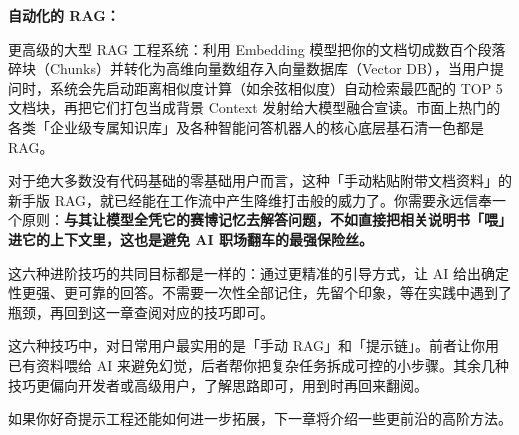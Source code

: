 \textbf{自动化的 RAG：}

更高级的大型 RAG 工程系统：利用 Embedding 模型把你的文档切成数百个段落碎块（Chunks）并转化为高维向量数组存入向量数据库（Vector DB），当用户提问时，系统会先启动距离相似度计算（如余弦相似度）自动检索最匹配的 TOP 5 文档块，再把它们打包当成背景 Context 发射给大模型融合宣读。市面上热门的各类「企业级专属知识库」及各种智能问答机器人的核心底层基石清一色都是 RAG。

对于绝大多数没有代码基础的零基础用户而言，这种「手动粘贴附带文档资料」的新手版 RAG，就已经能在工作流中产生降维打击般的威力了。你需要永远信奉一个原则：\textbf{与其让模型全凭它的赛博记忆去解答问题，不如直接把相关说明书「喂」进它的上下文里，这也是避免 AI 职场翻车的最强保险丝。}

这六种进阶技巧的共同目标都是一样的：通过更精准的引导方式，让 AI 给出确定性更强、更可靠的回答。不需要一次性全部记住，先留个印象，等在实践中遇到了瓶颈，再回到这一章查阅对应的技巧即可。

\begin{tipbox}
这六种技巧中，对日常用户最实用的是「手动 RAG」和「提示链」。前者让你用已有资料喂给 AI 来避免幻觉，后者帮你把复杂任务拆成可控的小步骤。其余几种技巧更偏向开发者或高级用户，了解思路即可，用到时再回来翻阅。
\end{tipbox}

如果你好奇提示工程还能如何进一步拓展，下一章将介绍一些更前沿的高阶方法。
